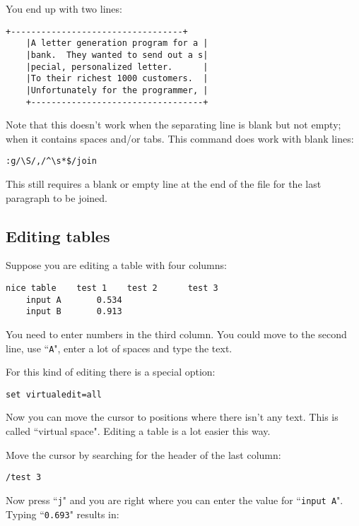 You end up with two lines:

\begin{Verbatim}[samepage=true]
    +----------------------------------+
    |A letter generation program for a |
    |bank.  They wanted to send out a s|
    |pecial, personalized letter.      |
    |To their richest 1000 customers.  |
    |Unfortunately for the programmer, |
    +----------------------------------+
\end{Verbatim}

Note that this doesn't work when the separating line is blank but not empty; when it contains spaces and/or tabs.
This command does work with blank lines:

\begin{Verbatim}[samepage=true]
 :g/\S/,/^\s*$/join
\end{Verbatim}

This still requires a blank or empty line at the end of the file for the last paragraph to be joined.
\subsection{Editing tables}
Suppose you are editing a table with four columns:

\begin{Verbatim}[samepage=true]
    nice table    test 1    test 2      test 3
    input A       0.534
    input B       0.913
\end{Verbatim}

You need to enter numbers in the third column.
You could move to the second line, use ``\texttt{A}", enter a lot of spaces and type the text.

For this kind of editing there is a special option:

\begin{Verbatim}[samepage=true]
 set virtualedit=all
\end{Verbatim}

Now you can move the cursor to positions where there isn't any text.
This is called ``virtual space".
Editing a table is a lot easier this way.

Move the cursor by searching for the header of the last column:

\begin{Verbatim}[samepage=true]
 /test 3
\end{Verbatim}

Now press ``\texttt{j}" and you are right where you can enter the value for ``\texttt{input A}".
Typing ``\texttt{0.693}" results in:


